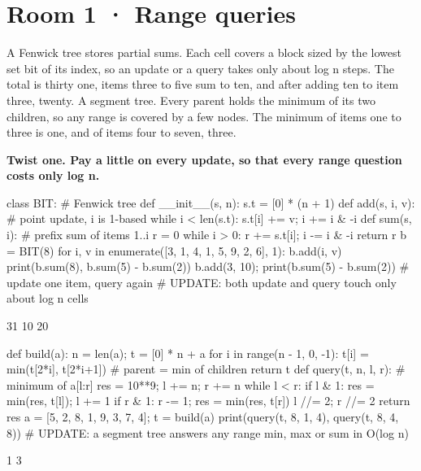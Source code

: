 \documentclass[11pt,a4paper]{report}
\begin{document}
\section*{Room 1 · Range queries}
A Fenwick tree stores partial sums. Each cell covers a block sized by the lowest set bit of its index, so an update or a query takes only about log n steps. The total is thirty one, items three to five sum to ten, and after adding ten to item three, twenty. A segment tree. Every parent holds the minimum of its two children, so any range is covered by a few nodes. The minimum of items one to three is one, and of items four to seven, three.
\begin{tcolorbox}[colback=yellow!12,colframe=orange!70!black,boxrule=0.4pt,left=4pt,right=4pt,top=2pt,bottom=2pt]\textbf{Twist one. Pay a little on every update, so that every range question costs only log n.}\end{tcolorbox}
\begin{Code}
class BIT:                                  # Fenwick tree
    def __init__(s, n): s.t = [0] * (n + 1)
    def add(s, i, v):                       # point update, i is 1-based
        while i < len(s.t): s.t[i] += v; i += i & -i
    def sum(s, i):                          # prefix sum of items 1..i
        r = 0
        while i > 0: r += s.t[i]; i -= i & -i
        return r
b = BIT(8)
for i, v in enumerate([3, 1, 4, 1, 5, 9, 2, 6], 1): b.add(i, v)
print(b.sum(8), b.sum(5) - b.sum(2))
b.add(3, 10); print(b.sum(5) - b.sum(2))   # update one item, query again
# UPDATE: both update and query touch only about log n cells
\end{Code}
\begin{Out}
31 10
20
\end{Out}
\begin{Code}
def build(a):
    n = len(a); t = [0] * n + a
    for i in range(n - 1, 0, -1): t[i] = min(t[2*i], t[2*i+1])   # parent = min of children
    return t
def query(t, n, l, r):                      # minimum of a[l:r]
    res = 10**9; l += n; r += n
    while l < r:
        if l & 1: res = min(res, t[l]); l += 1
        if r & 1: r -= 1; res = min(res, t[r])
        l //= 2; r //= 2
    return res
a = [5, 2, 8, 1, 9, 3, 7, 4]; t = build(a)
print(query(t, 8, 1, 4), query(t, 8, 4, 8))
# UPDATE: a segment tree answers any range min, max or sum in O(log n)
\end{Code}
\begin{Out}
1 3
\end{Out}
\end{document}
